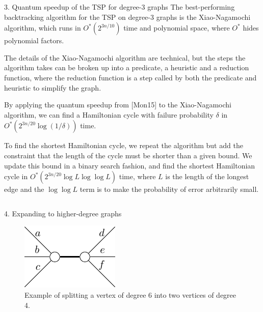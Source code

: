 \documentclass[]{templates/poster}
\begin{document}
\begin{frame}{}
\begin{columns}[t]
\begin{column}{0.422\linewidth}
\begin{block}{\Large 3. Quantum speedup of the TSP for degree-3 graphs}
  The best-performing backtracking algorithm for the TSP on degree-3 graphs is the Xiao-Nagamochi algorithm, which runs in $O^*(2^{3n/10})$ time and polynomial space, where $O^*$ hides polynomial factors.
  
  The details of the Xiao-Nagamochi algorithm are technical, but the steps the algorithm takes can be broken up into a predicate, a heuristic and a reduction function, where the reduction function is a step called by both the predicate and heuristic to simplify the graph.

  By applying the quantum speedup from [Mon15] to the Xiao-Nagamochi algorithm, we can find a Hamiltonian cycle with failure probability $\delta$ in $O^*(2^{3n/20}\log(1/\delta))$ time.
  
  To find the shortest Hamiltonian cycle, we repeat the algorithm but add the constraint that the length of the cycle must be shorter than a given bound. We update this bound in a binary search fashion, and find the shortest Hamiltonian cycle in $O^*(2^{3n/20}\log L\log\log L)$ time, where $L$ is the length of the longest edge and the $\log\log L$ term is to make the probability of error arbitrarily small.
  \end{block}
  \end{column}
\end{columns}
  
  \begin{columns}[t]
  \begin{column}{0.422\linewidth}

  \begin{block}{\Large 4. Expanding to higher-degree graphs}
  \begin{figure}
  \begin{framed}\raggedleft
  \includegraphics[width=\linewidth]{deg5}
  \caption{Example of splitting a vertex of degree 6 into two vertices of degree 4.}
  \end{framed}
  \end{figure}


\end{block}
\end{column}
\end{columns}
\end{frame}
\end{document}

